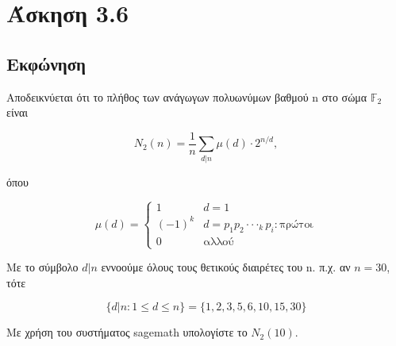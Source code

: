 \section{Άσκηση 3.6}

\subsection{Εκφώνηση}

Αποδεικνύεται ότι το πλήθος των ανάγωγων πολυωνύμων βαθμού n στο σώμα $\mathbb{F}_2$ είναι

\begin{equation}
    N_2(n) = \frac{1}{n} \sum_{d|n}\mu(d) \cdot 2^{n/d},
\end{equation}

όπου

\begin{equation}
    \mu(d) = 
    \begin{cases}
      1 & d = 1 \\
      (-1)^k & d = p_1p_2\cdot\cdot\cdotp_k p_i :\text{πρώτοι}\\
      0 & \text{αλλού}
    \end{cases}
\end{equation}

Με το σύμβολο $d|n$ εννοούμε όλους τους θετικούς διαιρέτες του n. π.χ. αν $n = 30$, τότε

\begin{equation}
    \{d|n: 1 \le d \le n\} = \{1, 2, 3, 5, 6, 10, 15, 30\}
\end{equation}

Με χρήση του συστήματος sagemath υπολογίστε το $N_2(10)$.